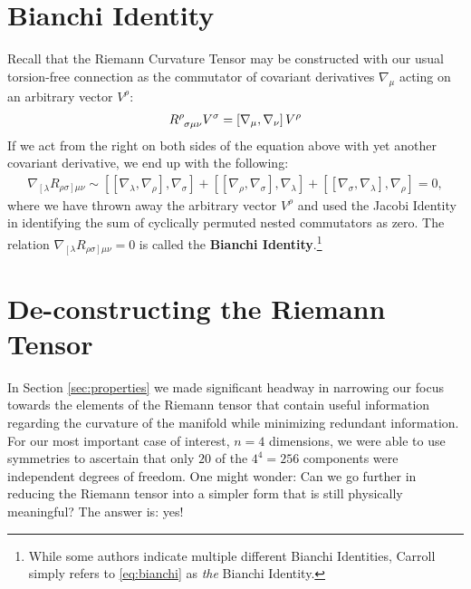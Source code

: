 \documentclass[10pt]{article}
\begin{document}
    \section{Bianchi Identity}
    Recall that the Riemann Curvature Tensor may be constructed with our usual torsion-free connection as the commutator of covariant derivatives $\nabla_{\mu}$ acting on an arbitrary vector $V^{\rho}$: 
    \begin{align}
    	\tensor{R}{^\rho_\sigma_\mu_\nu}V^{\sigma} = \left[ \nabla_{\mu}, \nabla_{\nu} \right] V^{\rho} \label{eq:commutator}
    \end{align}
    If we act from the right on both sides of the equation above with yet another covariant derivative, we end up with the following:
    \begin{align}
    	\nabla_{\left[\lambda\right.}R_{\left.\rho\sigma\right]\mu\nu} \sim [[\nabla_{\lambda}, \nabla_{\rho}], \nabla_{\sigma}] + [[\nabla_{\rho}, \nabla_{\sigma}], \nabla_{\lambda}] + [[\nabla_{\sigma}, \nabla_{\lambda}], \nabla_{\rho}] = 0, \label{eq:bianchi}
    \end{align}
    where we have thrown away the arbitrary vector $V^{\rho}$ and used the Jacobi Identity in identifying the sum of cyclically permuted nested commutators as zero. The relation $\nabla_{\left[\lambda\right.}R_{\left.\rho\sigma\right]\mu\nu}=0$ is called the \textbf{Bianchi Identity}.\footnote{While some authors indicate multiple different Bianchi Identities, Carroll simply refers to \eqref{eq:bianchi} as \textit{the} Bianchi Identity.}

    \section{De-constructing the Riemann Tensor} \label{sec:deconstructing}
    In Section \ref{sec:properties} we made significant headway in narrowing our focus towards the elements of the Riemann tensor that contain useful information regarding the curvature of the manifold while minimizing redundant information. For our most important case of interest, $n=4$ dimensions, we were able to use symmetries to ascertain that only $20$ of the $4^4=256$ components were independent degrees of freedom. One might wonder: Can we go further in reducing the Riemann tensor into a simpler form that is still physically meaningful? The answer is: yes!
\end{document}
